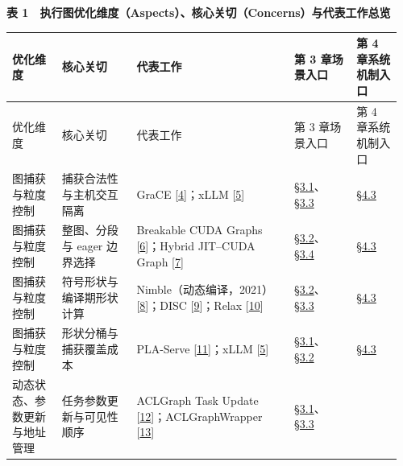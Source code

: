 \documentclass[UTF8,10.5pt,fontset=windows]{ctexart}
\newcommand{\TableTitle}[1]{\par\Needspace{5\baselineskip}\begingroup\centering\bfseries\fontsize{9.5}{13}\selectfont #1\par\endgroup\nobreak}
\begin{document}
\begin{landscape}
\begingroup
\fontsize{8.6}{11.8}\selectfont
\setlength{\tabcolsep}{2.5pt}
\setlength{\emergencystretch}{0.5\linewidth}
\renewcommand{\arraystretch}{1.10}
\TableTitle{\textbf{表
1　执行图优化维度（Aspects）、核心关切（Concerns）与代表工作总览}}
\begin{longtable}[c]{@{}>{\raggedright\arraybackslash}p{0.1248\linewidth}
>{\raggedright\arraybackslash}p{0.1824\linewidth}
>{\raggedright\arraybackslash}p{0.3840\linewidth}
>{\raggedright\arraybackslash}p{0.1536\linewidth}
>{\raggedright\arraybackslash}p{0.1152\linewidth}@{}}
\toprule
优化维度 & 核心关切 & 代表工作 & 第 3 章场景入口 & 第 4
章系统机制入口 \\
\midrule\endfirsthead
\toprule
优化维度 & 核心关切 & 代表工作 & 第 3 章场景入口 & 第 4
章系统机制入口 \\
\midrule\endhead
\bottomrule\endfoot
\bottomrule\endlastfoot
图捕获与粒度控制 & 捕获合法性与主机交互隔离 & GraCE
{[}\protect\hyperlink{ref-ghosh2026grace}{4}{]}；xLLM
{[}\protect\hyperlink{ref-liu2025xllm}{5}{]} &
\protect\hyperlink{section-3-1}{§3.1}、\protect\hyperlink{section-3-3}{§3.3}
& \protect\hyperlink{section-4-3}{§4.3} \\
图捕获与粒度控制 & 整图、分段与 eager 边界选择 & Breakable CUDA Graphs
{[}\protect\hyperlink{ref-lmsys2026breakable}{6}{]}；Hybrid JIT--CUDA
Graph {[}\protect\hyperlink{ref-yadav2026hybridpreprint}{7}{]} &
\protect\hyperlink{section-3-2}{§3.2}、\protect\hyperlink{section-3-4}{§3.4}
& \protect\hyperlink{section-4-3}{§4.3} \\
图捕获与粒度控制 & 符号形状与编译期形状计算 &
Nimble（动态编译，2021）{[}\protect\hyperlink{ref-shen2021nimble}{8}{]}；DISC
{[}\protect\hyperlink{ref-zhu2021disc}{9}{]}；Relax
{[}\protect\hyperlink{ref-lai2025relax}{10}{]} &
\protect\hyperlink{section-3-2}{§3.2}、\protect\hyperlink{section-3-3}{§3.3}
& \protect\hyperlink{section-4-3}{§4.3} \\
图捕获与粒度控制 & 形状分桶与捕获覆盖成本 & PLA-Serve
{[}\protect\hyperlink{ref-she2026plaserve}{11}{]}；xLLM
{[}\protect\hyperlink{ref-liu2025xllm}{5}{]} &
\protect\hyperlink{section-3-1}{§3.1}、\protect\hyperlink{section-3-2}{§3.2}
& \protect\hyperlink{section-4-3}{§4.3} \\
动态状态、参数更新与地址管理 & 任务参数更新与可见性顺序 & ACLGraph Task
Update {[}\protect\hyperlink{ref-cann910update}{12}{]}；ACLGraphWrapper
{[}\protect\hyperlink{ref-vllmascend0130impl}{13}{]} &
\protect\hyperlink{section-3-1}{§3.1}、\protect\hyperlink{section-3-3}{§3.3}

\end{longtable}
\end{landscape}
\end{document}
